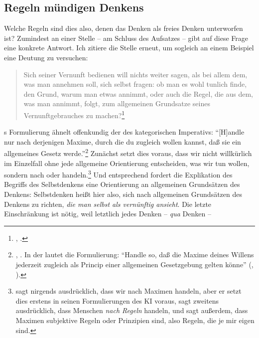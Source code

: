 \subsection{Regeln mündigen Denkens}
Welche Regeln sind dies also, denen das Denken als freies Denken unterworfen
ist? Zumindest an einer Stelle -- am Schluss des Aufsatzes  -- gibt  auf diese
Frage eine konkrete Antwort. Ich zitiere die Stelle erneut, um sogleich an einem Beispiel eine
Deutung zu versuchen:
\begin{quote}
  Sich seiner  Vernunft bedienen will nichts weiter sagen, als bei
  allem dem, was man annehmen soll, sich selbst fragen: ob man es wohl tunlich
  finde, den Grund, warum man etwas annimmt, oder auch die Regel, die aus dem,
  was man annimmt, folgt, zum allgemeinen Grundsatze seines Vernunftgebrauches
  zu machen?\footnote{\cite[][A
  329]{Kant:Washeisst:SichimDenkenorientieren?1977},
  \cite[][VIII: 146.35--37, 147.5--7]{Kant:GesammelteWerke1900ff.}.}
\end{quote}
s Formulierung ähnelt offenkundig der des kategorischen
Imperativs: \enquote{[H]andle nur nach derjenigen Maxime, durch die du
zugleich wollen kannst, daß sie ein allgemeines Gesetz
werde.}\footnote{\cite[][BA 52]{Kant:GrundlegungzurMetaphysikderSitten1965},
\cite[][IV:421.7--8]{Kant:GesammelteWerke1900ff.}. In der  lautet die Formulierung: \enquote{Handle so, daß die
Maxime deines Willens jederzeit zugleich als Princip einer allgemeinen Gesetzgebung gelten könne}
(\cite[][\S~7]{Kant:KritikderpraktischenVernunft1974}, \cite[][V:
30.38--39]{Kant:GesammelteWerke1900ff.}).} Zunächst setzt dies voraus, dass wir
nicht willkürlich im Einzelfall ohne jede allgemeine Orientierung entscheiden,
was wir tun wollen, sondern nach  oder
 handeln.\footnote{
sagt nirgends ausdrücklich, dass wir nach Maximen handeln, aber er setzt dies erstens in seinen Formulierungen des KI
voraus, sagt zweitens ausdrücklich, dass Menschen \emph{nach Regeln} handeln,
und sagt außerdem, dass Maximen subjektive Regeln oder Prinzipien sind, also
Regeln, die je mir eigen sind.} Und entsprechend fordert die Explikation des
Begriffs des Selbstdenkens eine Orientierung an allgemeinen Grundsätzen des
Denkens: Selbstdenken heißt hier also, sich nach allgemeinen Grundsätzen des
Denkens zu richten, \emph{die man selbst als vernünftig ansieht}. Die letzte
Einschränkung ist nötig, weil letztlich jedes Denken -- \emph{qua} Denken --
